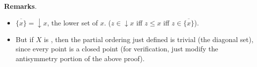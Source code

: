 \documentclass[12pt]{article}
\begin{document}
\textbf{Remarks}.
\begin{itemize}
\item $\overline{\lbrace x\rbrace}=\downarrow x$, the lower set of $x$.  ($z\in \downarrow x$ iff $z\le x$ iff $z\in\overline{\lbrace x\rbrace}$).
\item But if $X$ is , then the partial ordering just defined is trivial (the diagonal set), since every point is a closed point (for verification, just modify the antisymmetry portion of the above proof).
\end{itemize}
\end{document}
